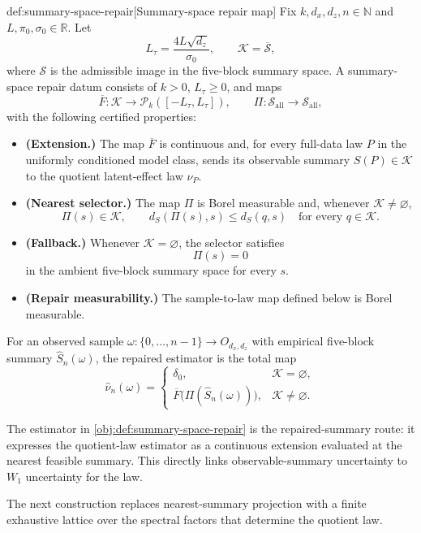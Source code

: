 \documentclass[11pt]{article}
\begin{document}
\begin{algorithmv}{def:summary-space-repair}[Summary-space repair map]
Fix \(k,d_x,d_z,n\in\mathbb N\) and \(L,\pi_0,\sigma_0\in\mathbb R\). Let
\[
L_\tau=\frac{4L\sqrt{d_z}}{\sigma_0},
\qquad
\mathcal K=\overline{\mathscr S},
\]
where \(\mathscr S\) is the admissible image in the five-block summary space. A summary-space repair datum consists of \(k>0\), \(L_\tau\ge 0\), and maps
\[
\overline F:\mathcal K\to \mathcal P_k([-L_\tau,L_\tau]),
\qquad
\Pi:\mathscr S_{\mathrm{all}}\to \mathscr S_{\mathrm{all}},
\]
with the following certified properties:
\begin{itemize}
\item \textbf{(Extension.)} The map \(\overline F\) is continuous and, for every full-data law \(P\) in the uniformly conditioned model class, sends its observable summary \(S(P)\in\mathcal K\) to the quotient latent-effect law \(\nu_P\).
\item \textbf{(Nearest selector.)} The map \(\Pi\) is Borel measurable and, whenever \(\mathcal K\ne\varnothing\),
\[
\Pi(s)\in\mathcal K,
\qquad
d_S(\Pi(s),s)\le d_S(q,s)\quad\text{for every }q\in\mathcal K .
\]
\item \textbf{(Fallback.)} Whenever \(\mathcal K=\varnothing\), the selector satisfies
\[
\Pi(s)=0
\]
in the ambient five-block summary space for every \(s\).
\item \textbf{(Repair measurability.)} The sample-to-law map defined below is Borel measurable.
\end{itemize}
For an observed sample \(\omega:\{0,\ldots,n-1\}\to O_{d_x,d_z}\) with empirical five-block summary \(\widehat S_n(\omega)\), the repaired estimator is the total map
\[
\widehat\nu_n(\omega)=
\begin{cases}
\delta_0, & \mathcal K=\varnothing,\\
\overline F\bigl(\Pi(\widehat S_n(\omega))\bigr), & \mathcal K\ne\varnothing .
\end{cases}
\]
\end{algorithmv}

The estimator in \cref{obj:def:summary-space-repair} is the repaired-summary route: it expresses the quotient-law estimator as a continuous extension evaluated at the nearest feasible summary. This directly links observable-summary uncertainty to \(W_1\) uncertainty for the law.

The next construction replaces nearest-summary projection with a finite exhaustive lattice over the spectral factors that determine the quotient law.
\end{document}
